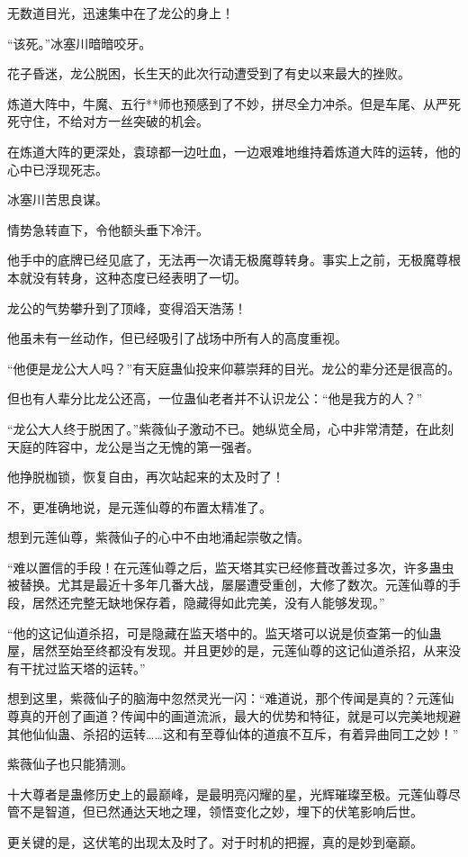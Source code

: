 \begin{this_body}
无数道目光，迅速集中在了龙公的身上！

“该死。”冰塞川暗暗咬牙。

花子昏迷，龙公脱困，长生天的此次行动遭受到了有史以来最大的挫败。

炼道大阵中，牛魔、五行**师也预感到了不妙，拼尽全力冲杀。但是车尾、从严死死守住，不给对方一丝突破的机会。

在炼道大阵的更深处，袁琼都一边吐血，一边艰难地维持着炼道大阵的运转，他的心中已浮现死志。

冰塞川苦思良谋。

情势急转直下，令他额头垂下冷汗。

他手中的底牌已经见底了，无法再一次请无极魔尊转身。事实上之前，无极魔尊根本就没有转身，这种态度已经表明了一切。

龙公的气势攀升到了顶峰，变得滔天浩荡！

他虽未有一丝动作，但已经吸引了战场中所有人的高度重视。

“他便是龙公大人吗？”有天庭蛊仙投来仰慕崇拜的目光。龙公的辈分还是很高的。

但也有人辈分比龙公还高，一位蛊仙老者并不认识龙公：“他是我方的人？”

“龙公大人终于脱困了。”紫薇仙子激动不已。她纵览全局，心中非常清楚，在此刻天庭的阵容中，龙公是当之无愧的第一强者。

他挣脱枷锁，恢复自由，再次站起来的太及时了！

不，更准确地说，是元莲仙尊的布置太精准了。

想到元莲仙尊，紫薇仙子的心中不由地涌起崇敬之情。

“难以置信的手段！在元莲仙尊之后，监天塔其实已经修葺改善过多次，许多蛊虫被替换。尤其是最近十多年几番大战，屡屡遭受重创，大修了数次。元莲仙尊的手段，居然还完整无缺地保存着，隐藏得如此完美，没有人能够发现。”

“他的这记仙道杀招，可是隐藏在监天塔中的。监天塔可以说是侦查第一的仙蛊屋，居然至始至终都没有发现。并且更妙的是，元莲仙尊的这记仙道杀招，从来没有干扰过监天塔的运转。”

想到这里，紫薇仙子的脑海中忽然灵光一闪：“难道说，那个传闻是真的？元莲仙尊真的开创了画道？传闻中的画道流派，最大的优势和特征，就是可以完美地规避其他仙仙蛊、杀招的运转……这和有至尊仙体的道痕不互斥，有着异曲同工之妙！”

紫薇仙子也只能猜测。

十大尊者是蛊修历史上的最巅峰，是最明亮闪耀的星，光辉璀璨至极。元莲仙尊尽管不是智道，但已然通达天地之理，领悟变化之妙，埋下的伏笔影响后世。

更关键的是，这伏笔的出现太及时了。对于时机的把握，真的是妙到毫巅。


\end{this_body}
